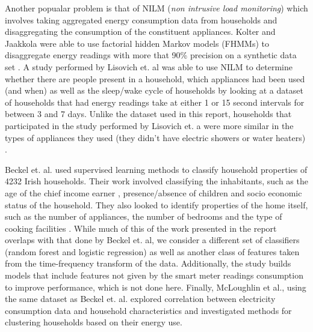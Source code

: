 Another popualar problem is that of NILM (\textit{non intrusive load monitoring}) which involves taking aggregated energy consumption data from households and disaggregating the consumption of the constituent appliances. Kolter and Jaakkola were able to use factorial hidden Markov models (FHMMs) to disaggregate energy readings with more that 90\% precision on a synthetic data set \cite{Kolter}. A study performed by Lisovich et. al was able to use NILM to determine whether there are people present in a household, which appliances had been used (and when) as well as the sleep/wake cycle of households by looking at a dataset of households that had energy readings take at either 1 or 15 second intervals for between 3 and 7 days. Unlike the dataset used in this report, households that participated in the study performed by Lisovich et. a were more similar in the types of appliances they used (they didn't have electric showers or water heaters) \cite{LMW}.


Beckel et. al. used supervised learning methods to classify household properties of 4232 Irish households. Their work involved classifying the inhabitants, such as the age of the chief income earner , presence/absence of children and socio economic status of the household. They also looked to identify properties of the home itself, such as the number of appliances, the number of bedrooms and the type of cooking facilities \cite{Beckel_3}. While much of this of the work presented in the report overlaps with that done by Beckel et. al, we consider a different set of classifiers (random forest and logistic regression) as well as another class of features taken from the time-frequency transform of the data. Additionally, the study builds models that include features not given by the smart meter readings consumption to improve performance, which is not done here. Finally, McLoughlin et al., using the same dataset as Beckel et. al.  explored correlation between electricity consumption data and household characteristics and investigated methods for clustering households based on their energy use.




